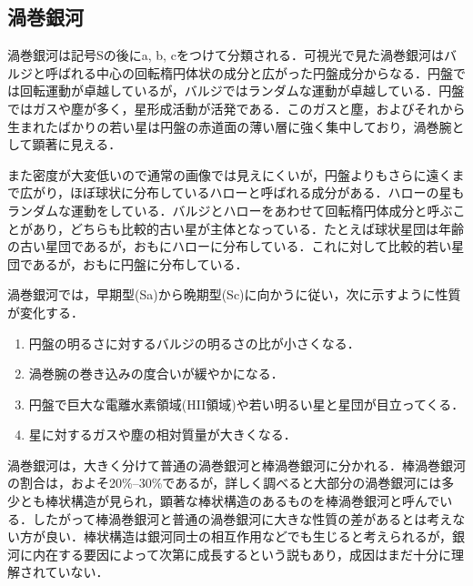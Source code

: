\subsection{渦巻銀河}

渦巻銀河は記号Sの後にa, b, cをつけて分類される．可視光で見た渦巻銀河はバルジと呼ばれる中心の回転楕円体状の成分と広がった円盤成分からなる．円盤では回転運動が卓越しているが，バルジではランダムな運動が卓越している．円盤ではガスや塵が多く，星形成活動が活発である．このガスと塵，およびそれから生まれたばかりの若い星は円盤の赤道面の薄い層に強く集中しており，渦巻腕として顕著に見える．

また密度が大変低いので通常の画像では見えにくいが，円盤よりもさらに遠くまで広がり，ほぼ球状に分布しているハローと呼ばれる成分がある．ハローの星もランダムな運動をしている．バルジとハローをあわせて回転楕円体成分と呼ぶことがあり，どちらも比較的古い星が主体となっている．たとえば球状星団は年齢の古い星団であるが，おもにハローに分布している．これに対して比較的若い星団であるが，おもに円盤に分布している．

渦巻銀河では，早期型(Sa)から晩期型(Sc)に向かうに従い，次に示すように性質が変化する．

\begin{enumerate}[(1)]
	\item 円盤の明るさに対するバルジの明るさの比が小さくなる．
	\item 渦巻腕の巻き込みの度合いが緩やかになる．
	\item 円盤で巨大な電離水素領域(HII領域)や若い明るい星と星団が目立ってくる．
	\item 星に対するガスや塵の相対質量が大きくなる．
\end{enumerate}

渦巻銀河は，大きく分けて普通の渦巻銀河と棒渦巻銀河に分かれる．棒渦巻銀河の割合は，およそ20\%--30\%であるが，詳しく調べると大部分の渦巻銀河には多少とも棒状構造が見られ，顕著な棒状構造のあるものを棒渦巻銀河と呼んでいる．したがって棒渦巻銀河と普通の渦巻銀河に大きな性質の差があるとは考えない方が良い．棒状構造は銀河同士の相互作用などでも生じると考えられるが，銀河に内在する要因によって次第に成長するという説もあり，成因はまだ十分に理解されていない．